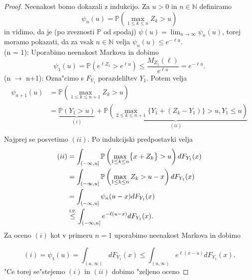 \documentclass[12pt, a4paper, reqno]{amsart}
\theoremstyle{definition}
\theoremstyle{plain}
\newcommand{\N}{\mathbb{N}}
\newcommand{\Prob}{\mathbb{P}}
\newcommand{\1}{\mathds{1}}
\begin{document}
            \begin{proof}
                Neenakost bomo dokazali z indukcijo. Za $u>0$ in $n\in\N$ definiramo
                \begin{equation*}
                    \psi_n(u) = \Prob\left(\max_{1\leq k\leq n}Z_k > u\right)
                \end{equation*}
                in vidimo, da je (po zveznosti $\mathbb{P}$ od spodaj) $\psi(u) = \lim_{n\to\infty}\psi_n(u)$, 
                torej moramo pokazati, da za vsak $n\in\N$ velja $\psi_n(u) \leq e^{-\ell u}$. \\
                (n = 1): Uporabimo neenakost Markova in dobimo
                \begin{equation*}
                    \psi_1(u) = \Prob\left(e^{\ell Z_1} > e^{\ell u}\right) \leq \frac{M_{Z_1}(\ell)}{e^{\ell u}} = e^{-\ell u}.
                \end{equation*}
                (n $\rightarrow$ n+1): 
                Ozna"cimo s $F_{Y_1}$ porazdeliltev $Y_1$. Potem velja
                \begin{align*}
                    \psi_{n+1}(u) &= \Prob\left(\max_{1\leq k\leq n+1}Z_k > u\right) \\
                                  &= \underbrace{\Prob\left(Y_1 > u\right)}_{(i)} + 
                                  \underbrace{\Prob\left(\max_{2\leq k\leq n+1}\bigl\{Y_1 + (Z_k - Y_1)\bigr\} > u, Y_1 \leq u\right)}_{(ii)} \\
                \end{align*}
                Najprej se posvetimo $(ii)$. Po indukcijski predpostavki velja 
                \begin{align*}
                    (ii) &= \int_{(-\infty, u]}\Prob\left(\max_{1\leq k\leq n}\bigl\{x + Z_k\bigr\} > u\right)dF_{Y_1}(x) \\
                         &= \int_{(-\infty, u]}\Prob\left(\max_{1\leq k\leq n}Z_k > u - x\right)dF_{Y_1}(x) \\
                         &= \int_{(-\infty, u]}\psi_n(u - x)dF_{Y_1}(x) \\
                         &\stackrel{\text{\scalebox{0.8}{I.P.}}}{\leq} \int_{(-\infty, u]}e^{-\ell(u - x)}dF_{Y_1}(x). \\
                \end{align*}
                Za oceno $(i)$ kot v primeru $n=1$ uporabimo neenakost Markova in dobimo

                \begin{equation*}
                    (i) = \psi_1(u) = \int_{(u, \infty)}dF_{Y_1}(x) \leq \int_{(u, \infty)}e^{\ell (x - u)}dF_{Y_1}(x).
                \end{equation*}
                "Ce torej se"stejemo $(i)$ in $(ii)$ dobimo "zeljeno oceno


\end{proof}
\end{document}
